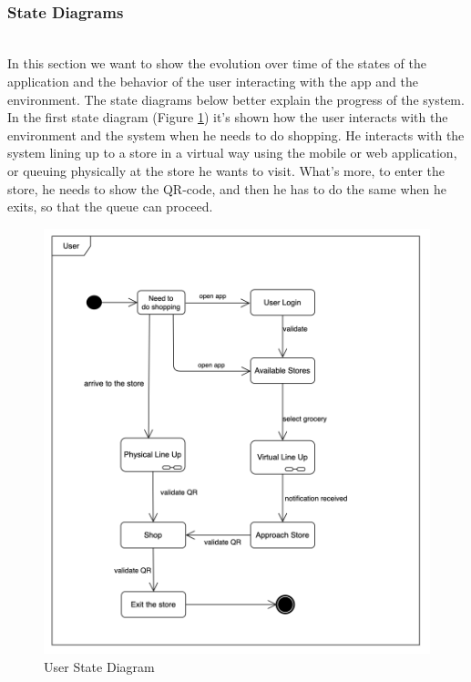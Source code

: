 \documentclass[]{article}
\begin{document}
	\textbf{}\\
		\subsubsection{State Diagrams}
		
		\textbf{}\\
		In this section we want to show the evolution over time of the states of the application and the behavior of the user interacting with the app and the environment. 
The state diagrams below better explain the progress of the system.
		\newline
		\newline
		In the first state diagram (Figure \ref{fig:state_diagram1}) it’s shown how the user interacts with the environment and the system when he needs to do shopping. He interacts with the system lining up to a store in a virtual way using the mobile or web application, or queuing physically at the store he wants to visit.
		What’s more, to enter the store, he needs to show the QR-code, and then he has to do the same when he exits, so that the queue can proceed. \\
		
		\begin{figure}[H]
			\centering
			\includegraphics[scale=0.8]{User_statediagram.png}
			\caption{User State Diagram}
			\label{fig:state_diagram1}
		\end{figure}
		
\end{document}
